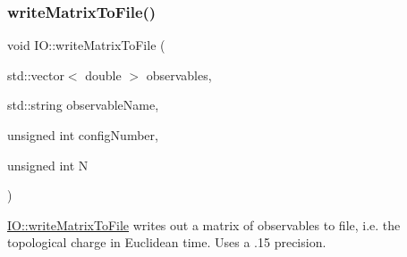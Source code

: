 \mbox{\label{namespace_i_o_ad77b7dd770afc8e2eb433d6187ea3616}} 
\subsubsection{\texorpdfstring{writeMatrixToFile()}{writeMatrixToFile()}}
{\footnotesize\ttfamily void I\+O\+::write\+Matrix\+To\+File (\begin{DoxyParamCaption}\item[{std\+::vector$<$ double $>$}]{observables,  }\item[{std\+::string}]{observable\+Name,  }\item[{unsigned int}]{config\+Number,  }\item[{unsigned int}]{N }\end{DoxyParamCaption})}



\mbox{\hyperlink{namespace_i_o_ad77b7dd770afc8e2eb433d6187ea3616}{I\+O\+::write\+Matrix\+To\+File}} writes out a matrix of observables to file, i.\+e. the topological charge in Euclidean time. Uses a .15 precision. 


